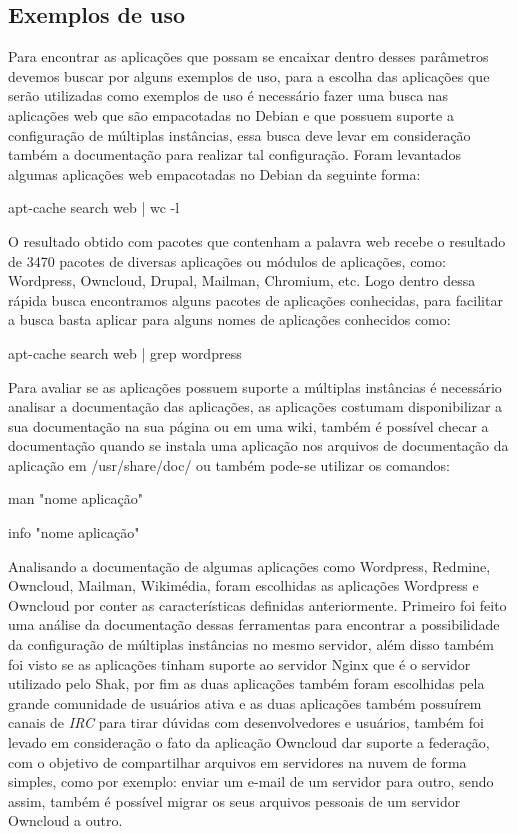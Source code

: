 \subsection{Exemplos de uso}
\label{subsection:exemplos}

Para encontrar as aplicações que possam se encaixar dentro desses parâmetros
devemos buscar por alguns exemplos de uso, para a escolha das aplicações que
serão utilizadas como exemplos de uso é necessário fazer uma busca nas aplicações
web que são empacotadas no Debian e que possuem suporte a configuração de múltiplas
instâncias, essa busca deve levar em consideração também a documentação para realizar
tal configuração. Foram levantados algumas aplicações web empacotadas no Debian da
seguinte forma:

\begin{center}
apt-cache search web | wc -l
\end{center}

O resultado obtido com pacotes que contenham a palavra web recebe o resultado de 3470
pacotes de diversas aplicações ou módulos de aplicações, como:
Wordpress, Owncloud, Drupal, Mailman, Chromium, etc. Logo dentro dessa rápida busca
encontramos alguns pacotes de aplicações conhecidas, para facilitar a busca basta
aplicar para alguns nomes de aplicações conhecidos como:

\begin{center}
apt-cache search web | grep wordpress
\end{center}

Para avaliar se as aplicações possuem suporte a múltiplas instâncias é necessário
analisar a documentação das aplicações, as aplicações costumam disponibilizar a sua
documentação na sua página ou em uma wiki, também é possível checar a documentação
quando se instala uma aplicação nos arquivos de documentação da aplicação em
/usr/share/doc/ ou também pode-se utilizar os comandos:

\begin{center}
man "nome aplicação"

info "nome aplicação"
\end{center}

Analisando a documentação de algumas aplicações como Wordpress, Redmine,
Owncloud, Mailman, Wikimédia, foram escolhidas as aplicações Wordpress e Owncloud por
conter as características definidas anteriormente. Primeiro
foi feito uma análise da documentação dessas ferramentas para encontrar a
possibilidade da configuração de múltiplas instâncias no mesmo servidor, além
disso também foi visto se as aplicações tinham suporte ao servidor Nginx que é
o servidor utilizado pelo Shak, por fim as duas aplicações também foram escolhidas
pela grande comunidade de usuários ativa e as duas aplicações também possuírem
canais de \textit{IRC} para tirar dúvidas com desenvolvedores e usuários, também foi levado
em consideração o fato da  aplicação Owncloud dar suporte a federação,
com  o objetivo de compartilhar arquivos em servidores na nuvem de forma simples,
como por exemplo: enviar um e-mail de um servidor para outro, sendo assim,
também é possível migrar os seus arquivos pessoais de um servidor Owncloud a outro.

